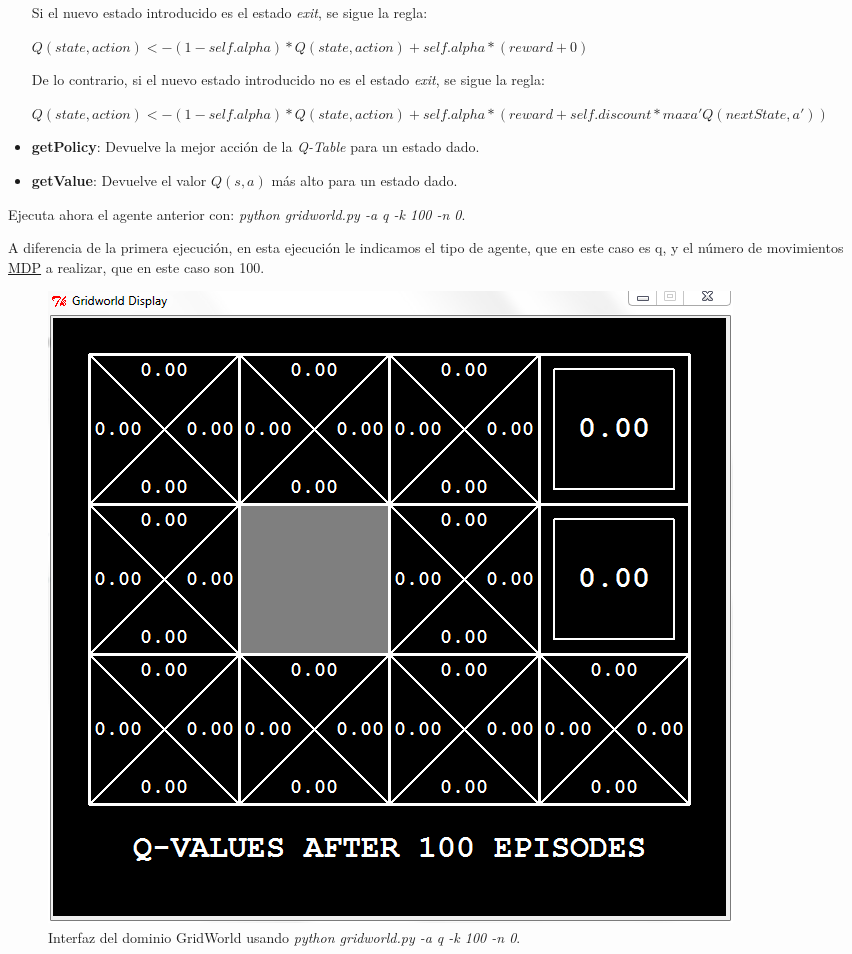 \documentclass[11pt]{exam}
\begin{document}
\begin{questions}
\begin{itemize}
	Si el nuevo estado introducido es el estado \textit{exit}, se sigue la regla:
	
	\begin{center}
		$Q(state,action) <- (1-self.alpha) * Q(state,action) + self.alpha * (reward + 0)$
	\end{center}

	De lo contrario, si el nuevo estado introducido no es el estado \textit{exit}, se sigue la regla:
	
	\begin{center}
		$Q(state,action) <- (1-self.alpha) * Q(state,action) + self.alpha * (reward + self.discount * max a' Q(nextState, a'))$
	\end{center}
	
	\item \textbf{getPolicy}: Devuelve la mejor acción de la \textit{Q-Table} para un estado dado.
	
	\item \textbf{getValue}: Devuelve el valor $Q(s,a)$ más alto para un estado dado.
		
\end{itemize}

{ \question Ejecuta ahora el agente anterior con: \textit{python gridworld.py -a q -k 100 -n 0}.}

A diferencia de la primera ejecución, en esta ejecución le indicamos el tipo de agente, que en este caso es q, y el número de movimientos \href{https://en.wikipedia.org/wiki/Markov_decision_process}{MDP} a realizar, que en este caso son 100.

\begin{figure}[h]
	\centering
	\includegraphics[scale=0.5]{image_2}
	\caption{Interfaz del dominio GridWorld usando \textit{python gridworld.py -a q -k 100 -n 0}.}
	\label{image_2}
\end{figure}


\end{questions}
\end{document}
